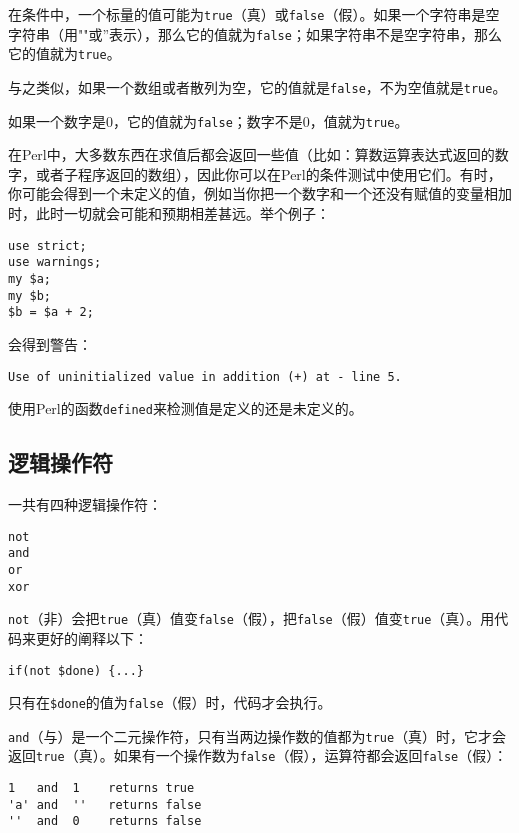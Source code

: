 在条件中，一个标量的值可能为\verb|true|（真）或\verb|false|（假）。如果一个字符串是空字符串（用""或''表示），那么它的值就为\verb|false|；如果字符串不是空字符串，那么它的值就为\verb|true|。

与之类似，如果一个数组或者散列为空，它的值就是\verb|false|，不为空值就是\verb|true|。

如果一个数字是0，它的值就为\verb|false|；数字不是0，值就为\verb|true|。

在Perl中，大多数东西在求值后都会返回一些值（比如：算数运算表达式返回的数字，或者子程序返回的数组），因此你可以在Perl的条件测试中使用它们。有时，你可能会得到一个未定义的值，例如当你把一个数字和一个还没有赋值的变量相加时，此时一切就会可能和预期相差甚远。举个例子：

\begin{lstlisting}
use strict;
use warnings;
my $a;
my $b;
$b = $a + 2;
\end{lstlisting}

会得到警告：

\begin{lstlisting}
Use of uninitialized value in addition (+) at - line 5.
\end{lstlisting}

使用Perl的函数\verb|defined|来检测值是定义的还是未定义的。

\subsection{逻辑操作符}
一共有四种逻辑操作符：

\begin{lstlisting}
not
and
or
xor
\end{lstlisting}

\verb|not|（非）会把\verb|true|（真）值变\verb|false|（假），把\verb|false|（假）值变\verb|true|（真）。用代码来更好的阐释以下：

\begin{lstlisting}
if(not $done) {...}
\end{lstlisting}

只有在\verb|$done|的值为\verb|false|（假）时，代码才会执行。

\verb|and|（与）是一个二元操作符，只有当两边操作数的值都为\verb|true|（真）时，它才会返回\verb|true|（真）。如果有一个操作数为\verb|false|（假），运算符都会返回\verb|false|（假）：

\begin{lstlisting}
1   and  1    returns true
'a' and  ''   returns false
''  and  0    returns false
\end{lstlisting}

